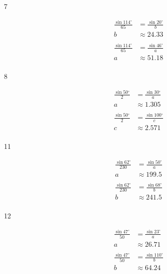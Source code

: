 \documentclass{exam}
\newcommand{\dg}{\ensuremath{^\circ}}
\begin{document}
\begin{description}
      \item[7] 
        \begin{align*}
          \frac{\sin 114 \dg}{65} & = \frac{\sin 20 \dg}{b} \\
          b                       & \approx \boxed{ 24.33 } \\
          \\
          \frac{\sin 114 \dg}{65} & = \frac{\sin 46 \dg}{a} \\
          a                       & \approx \boxed{ 51.18 } \\
        \end{align*}

      \item[8] 
        \begin{align*}
          \frac{\sin 50 \dg}{2} & = \frac{\sin 30 \dg}{a} \\
          a                       & \approx \boxed{ 1.305 } \\
          \\
          \frac{\sin 50 \dg}{2} & = \frac{\sin 100 \dg}{c} \\
          c                       & \approx \boxed{ 2.571 } \\
        \end{align*}

      \item[11] 
        \begin{align*}
          \frac{\sin 62 \dg}{230} & = \frac{\sin 50 \dg}{a} \\
          a                       & \approx \boxed{ 199.5 } \\
          \\
          \frac{\sin 62 \dg}{230} & = \frac{\sin 68 \dg}{b} \\
          b                       & \approx \boxed{ 241.5 } \\
        \end{align*}

      \item[12] 
        \begin{align*}
          \frac{\sin 47 \dg}{50} & = \frac{\sin 23 \dg}{a} \\
          a                      & \approx \boxed{ 26.71 } \\
          \\
          \frac{\sin 47 \dg}{50} & = \frac{\sin 110 \dg}{b} \\
          b                       & \approx \boxed{ 64.24 } \\
        \end{align*}


\end{description}
\end{document}

